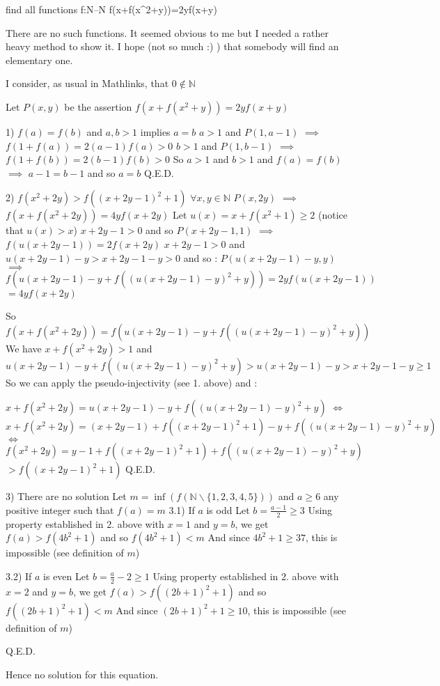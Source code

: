 \begin{solution}
	\begin{tcolorbox}find all functions f:N--N
f(x+f(x^2+y))=2yf(x+y)
 \end{tcolorbox}
There are no such functions. It seemed obvious to me but I needed a rather heavy method to show it. I hope (not so much :) ) that somebody will find an elementary one.

I consider, as usual in Mathlinks, that $ 0\notin\mathbb N$

Let $ P(x,y)$ be the assertion $ f(x+f(x^2+y))=2yf(x+y)$

1) $ f(a)=f(b)$ and $ a,b>1$ implies $ a=b$
$ a>1$ and $ P(1,a-1)$ $ \implies$ $ f(1+f(a))=2(a-1)f(a)>0$
$ b>1$ and $ P(1,b-1)$ $ \implies$ $ f(1+f(b))=2(b-1)f(b)>0$
So $ a>1$ and $ b>1$ and $ f(a)=f(b)$ $ \implies$ $ a-1=b-1$ and so $ a=b$
Q.E.D.

2) $ f(x^2+2y)>f((x+2y-1)^2+1)$ $ \forall x,y\in\mathbb N$
$ P(x,2y)$ $ \implies$ $ f(x+f(x^2+2y))=4yf(x+2y)$
Let $ u(x)=x+f(x^2+1)\ge 2$ (notice that $ u(x)>x$)
$ x+2y-1>0$ and so $ P(x+2y-1,1)$ $ \implies$ $ f(u(x+2y-1))=2f(x+2y)$
$ x+2y-1>0$ and $ u(x+2y-1)-y>x+2y-1-y>0$ and  so :
$ P(u(x+2y-1)-y,y)$ $ \implies$ $ f(u(x+2y-1)-y+f((u(x+2y-1)-y)^2+y))=2yf(u(x+2y-1))$ $ =4yf(x+2y)$

So $ f(x+f(x^2+2y))=f(u(x+2y-1)-y+f((u(x+2y-1)-y)^2+y))$
We have $ x+f(x^2+2y)>1$ and $ u(x+2y-1)-y+f((u(x+2y-1)-y)^2+y)>u(x+2y-1)-y>x+2y-1-y\ge 1$
So we can apply the pseudo-injectivity (see 1. above) and :

$ x+f(x^2+2y)=u(x+2y-1)-y+f((u(x+2y-1)-y)^2+y)$
$ \iff$ $ x+f(x^2+2y)=(x+2y-1)+f((x+2y-1)^2+1)-y+f((u(x+2y-1)-y)^2+y)$
$ \iff$ $ f(x^2+2y)=y-1+f((x+2y-1)^2+1)+f((u(x+2y-1)-y)^2+y)$ $ >f((x+2y-1)^2+1)$
Q.E.D.

3) There are no solution
Let $ m=\inf(f(\mathbb N\backslash\{1,2,3,4,5\}))$ and $ a\ge 6$ any positive integer such that $ f(a)=m$
3.1) If $ a$ is odd
Let $ b=\frac{a-1}2\ge 3$
Using property established in 2. above with $ x=1$ and $ y=b$, we get $ f(a)>f(4b^2+1)$ and so $ f(4b^2+1)<m$
And since $ 4b^2+1\ge 37$, this is impossible (see definition of $ m$)

3.2) If $ a$ is even
Let $ b=\frac a2-2\ge 1$
Using property established in 2. above with $ x=2$ and $ y=b$, we get $ f(a)>f((2b+1)^2+1)$ and so $ f((2b+1)^2+1)<m$
And since $ (2b+1)^2+1\ge 10$, this is impossible (see definition of $ m$)

Q.E.D.


Hence no solution for this equation.
\end{solution}



